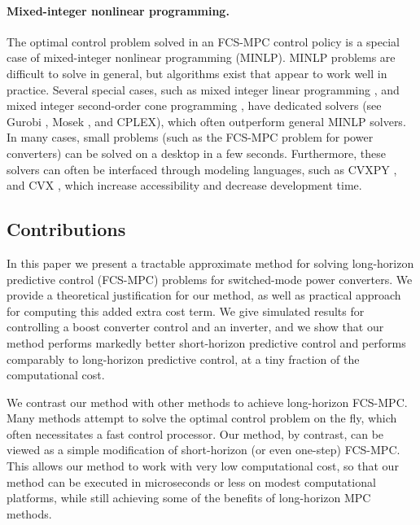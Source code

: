 \documentclass[12pt]{article}
\begin{document}
\paragraph{Mixed-integer nonlinear programming.}
The optimal control problem solved in an FCS-MPC control policy
is a special case of mixed-integer nonlinear programming (MINLP).
MINLP problems are difficult to solve in general,
but algorithms exist that appear to work well in practice.
Several special cases,
such as mixed integer linear programming \cite{wolsey1998integer},
and mixed integer second-order cone programming \cite{benson2013mixed},
have dedicated solvers
(see Gurobi \cite{gurobi}, Mosek \cite{andersen2000mosek}, and CPLEX),
which often outperform general MINLP solvers.
In many cases, small problems 
(such as the FCS-MPC problem for power converters)
can be solved on a desktop in a few seconds.
Furthermore, these solvers can often be interfaced through modeling languages,
such as CVXPY \cite{cvxpy}, and CVX \cite{cvx, gb08},
which increase accessibility and decrease development time.




\subsection{Contributions}
In this paper we present a tractable approximate method
for solving long-horizon predictive control (FCS-MPC)
problems for switched-mode power converters.
We provide a theoretical justification for our method,
as well as practical approach for computing this added extra cost term.
We give simulated results for controlling a boost converter control
and an inverter, 
and we show that our method performs markedly better short-horizon predictive control
and performs comparably to long-horizon predictive control,
at a tiny fraction of the computational cost.

We contrast our method with other methods to achieve long-horizon FCS-MPC.
Many methods attempt to solve the optimal control problem
on the fly, which often necessitates a fast control processor.
Our method, by contrast, 
can be viewed as a simple modification of short-horizon
(or even one-step) FCS-MPC.
This allows our method to work with very low computational cost,
so that our method can be executed
in microseconds or less on modest computational platforms,
while still achieving some of the benefits of long-horizon MPC methods.
\end{document}
